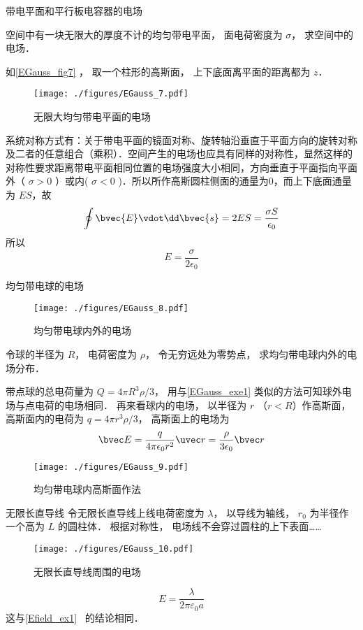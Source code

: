 \begin{example}{带电平面和平行板电容器的电场}

空间中有一块无限大的厚度不计的均匀带电平面， 面电荷密度为 $\sigma$， 求空间中的电场．

如\autoref{EGauss_fig7} ， 取一个柱形的高斯面， 上下底面离平面的距离都为 $z$．
\begin{figure}[ht]
\centering
\texttt{[image: ./figures/EGauss\_7.pdf]}
\caption{无限大均匀带电平面的电场} \label{EGauss_fig7}
\end{figure}
系统对称方式有：关于带电平面的镜面对称、旋转轴沿垂直于平面方向的旋转对称及二者的任意组合（乘积）．空间产生的电场也应具有同样的对称性，显然这样的对称性要求距离带电平面相同位置的电场强度大小相同，方向垂直于平面指向平面外（ $\sigma>0$ ）或内( $\sigma<0$ )．所以所作高斯圆柱侧面的通量为0，而上下底面通量为 $ES$，故
\begin{equation}
\oint \bvec{E}\vdot \dd\bvec{s}=2ES=\frac{\sigma S}{\epsilon_0}
\end{equation}
所以
\begin{equation}
E=\frac{\sigma}{2\epsilon_0}
\end{equation}

\end{example}

\begin{example}{均匀带电球的电场}\label{EGauss_exe3}
\begin{figure}[ht]
\centering
\texttt{[image: ./figures/EGauss\_8.pdf]}
\caption{均匀带电球内外的电场} \label{EGauss_fig8}
\end{figure}
令球的半径为 $R$， 电荷密度为 $\rho$， 令无穷远处为零势点， 求均匀带电球内外的电场分布． 

带点球的总电荷量为 $Q = 4\pi R^3\rho/3$， 用与\autoref{EGauss_exe1} 类似的方法可知球外电场与点电荷的电场相同． 再来看球内的电场， 以半径为 $r$ （$r < R$）作高斯面， 高斯面内的电荷为 $q = 4\pi r^3\rho/3$， 高斯面上的电场为
\begin{equation}
\bvec E = \frac{q}{4\pi\epsilon_0 r^2} \uvec r = \frac{\rho}{3\epsilon_0}\bvec r
\end{equation}
\begin{figure}[ht]
\centering
\texttt{[image: ./figures/EGauss\_9.pdf]}
\caption{均匀带电球内高斯面作法} \label{EGauss_fig9}
\end{figure}
\end{example}

\begin{example}{无限长直导线}
令无限长直导线上线电荷密度为 $\lambda$， 以导线为轴线， $r_0$ 为半径作一个高为 $L$ 的圆柱体． 根据对称性， 电场线不会穿过圆柱的上下表面……
\begin{figure}[ht]
\centering
\texttt{[image: ./figures/EGauss\_10.pdf]}
\caption{无限长直导线周围的电场} \label{EGauss_fig10}
\end{figure}

\begin{equation}
E=\frac{\lambda}{2 \pi \varepsilon_{0} a}
\end{equation}
这与\autoref{Efield_ex1}~ 的结论相同．
\end{example}

